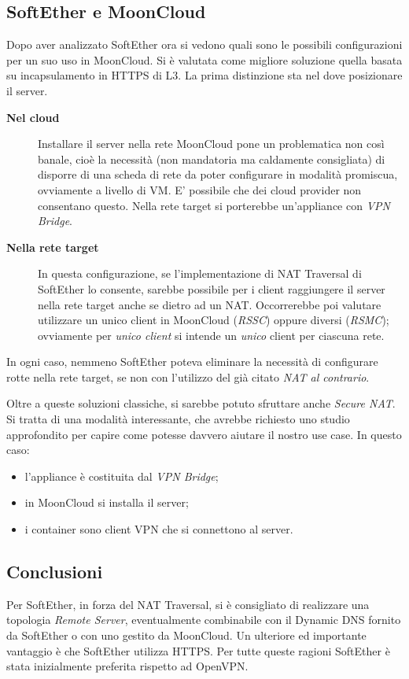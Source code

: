 \subsection{SoftEther e MoonCloud}
Dopo aver analizzato SoftEther ora si vedono quali sono le possibili configurazioni per un suo uso in MoonCloud.
Si è valutata come migliore soluzione quella basata su incapsulamento in HTTPS di L3.
La prima distinzione sta nel dove posizionare il server.
\begin{description}
  \item[\textbf{Nel cloud}]Installare il server nella rete MoonCloud pone un problematica
  non così banale, cioè la necessità (non mandatoria ma caldamente consigliata) di
  disporre di una scheda di rete da poter configurare in modalità promiscua, ovviamente
  a livello di VM. E' possibile che dei cloud provider non consentano questo.
  Nella rete target si porterebbe un'appliance con \textit{VPN Bridge}.
  \item[\textbf{Nella rete target}]In questa configurazione, se l'implementazione
  di NAT Traversal di SoftEther lo consente, sarebbe possibile per i client raggiungere
  il server nella rete target anche se dietro ad un NAT. Occorrerebbe poi valutare utilizzare
  un unico client in MoonCloud (\textit{RSSC}) oppure diversi (\textit{RSMC}); ovviamente
  per \textit{unico client} si intende un \textit{unico} client per ciascuna rete.
\end{description}
In ogni caso, nemmeno SoftEther poteva eliminare la necessità di configurare rotte
nella rete target, se non con l'utilizzo del già citato \textit{NAT al contrario}.

Oltre a queste soluzioni classiche, si sarebbe potuto sfruttare anche \textit{Secure NAT}.
Si tratta di una modalità interessante, che avrebbe richiesto uno studio approfondito
per capire come potesse davvero aiutare il nostro use case.
In questo caso:
  \begin{itemize}
    \item l'appliance è costituita dal \textit{VPN Bridge};
    \item in MoonCloud si installa il server;
    \item i container sono client VPN che si connettono al server.
  \end{itemize}


\subsection{Conclusioni}
Per SoftEther, in forza del NAT Traversal, si è consigliato di realizzare una topologia
\textit{Remote Server}, eventualmente combinabile con il Dynamic DNS fornito
da SoftEther o con uno gestito da MoonCloud.
Un ulteriore ed importante vantaggio è che SoftEther utilizza HTTPS. Per tutte queste
ragioni SoftEther è stata inizialmente preferita rispetto ad OpenVPN.
